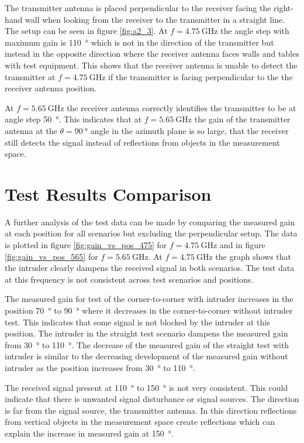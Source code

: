The transmitter antenna is placed perpendicular to the receiver facing the right-hand wall when looking from the receiver to the transmitter in a straight line. The setup can be seen in figure \ref{fig:a2_3}. At $f=\SI{4.75}{\giga\hertz}$ the angle step with maximum gain is \SI{110}{\degree} which is not in the direction of the transmitter but instead in the opposite direction where the receiver antenna faces walls and tables with test equipment. This shows that the receiver antenna is unable to detect the transmitter at $f=\SI{4.75}{\giga\hertz}$ if the transmitter is facing perpendicular to the the receiver antenna position. 

At $f=\SI{5.65}{\giga\hertz}$ the receiver antenna correctly identifies the transmitter to be at angle step \SI{50}{\degree}. This indicates that at $f=\SI{5.65}{\giga\hertz}$ the gain of the transmitter antenna at the $\theta=\SI{90}{\degree}$ angle in the azimuth plane is so large, that the receiver still detects the signal instead of reflections from objects in the measurement space. 

\section{Test Results Comparison}
A further analysis of the test data can be made by comparing the measured gain at each position for all scenarios but excluding the perpendicular setup. The data is plotted in figure \ref{fig:gain_vs_pos_475} for $f=\SI{4.75}{\giga\hertz}$ and in figure \ref{fig:gain_vs_pos_565} for $f=\SI{5.65}{\giga\hertz}$. At $f=\SI{4.75}{\giga\hertz}$ the graph shows that the intruder clearly dampens the received signal in both scenarios. The test data at this frequency is not consistent across test scenarios and positions. 

The measured gain for test of the corner-to-corner with intruder increases in the position \SI{70}{\degree} to \SI{90}{\degree} where it decreases in the corner-to-corner without intruder test. This indicates that some signal is not blocked by the intruder at this position. The intruder in the straight test scenario dampens the measured gain from \SI{30}{\degree} to \SI{110}{\degree}. The decrease of the measured gain of the straight test with intruder is similar to the decreasing development of the measured gain without intruder as the position increases from \SI{30}{\degree} to \SI{110}{\degree}. 

The received signal present at \SI{110}{\degree} to \SI{150}{\degree} is not very consistent. This could indicate that there is unwanted signal disturbance or signal sources. The direction is far from the signal source, the transmitter antenna. In this direction reflections from vertical objects in the measurement space create reflections which can explain the increase in measured gain at \SI{150}{\degree}.

